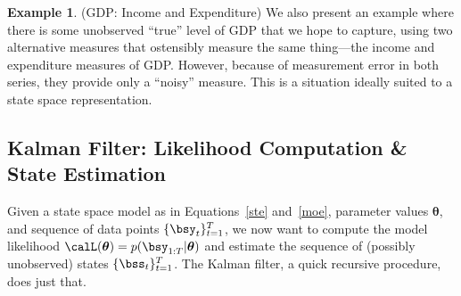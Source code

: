 \documentclass[12pt]{article}
\theoremstyle{plain}
\theoremstyle{definition}
\newtheorem{ex}[thm]{Example}
\theoremstyle{remark}
\newcommand{\bstheta}{\boldsymbol{\theta}}
\newcommand{\tT}{_{t=1}^T}
\begin{document}
\begin{ex}(GDP: Income and Expenditure)
We also present an example where there is some unobserved ``true'' level
of GDP that we hope to capture, using two alternative measures that
ostensibly measure the same thing---the income and expenditure measures
of GDP\@. However, because of measurement error in both series, they
provide only a ``noisy'' measure. This is a situation ideally suited to
a state space representation.
\end{ex}





\newpage
\subsection{Kalman Filter: Likelihood Computation \& State Estimation}

Given a state space model as in Equations~\ref{ste} and~\ref{moe},
parameter values $\bstheta$, and sequence of data points
$\{\bsy_t\}\tT$, we now want to compute the model
likelihood $\calL(\bstheta)=p(\bsy_{1:T}|\bstheta)$ and estimate the
sequence of (possibly unobserved) states $\{\bss_t\}\tT$.
The Kalman filter, a quick recursive procedure, does just that.
\end{document}
